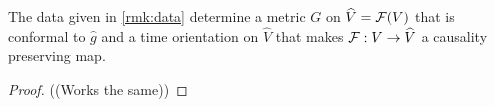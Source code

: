 \begin{lemma}\label{lem:constructmetric}
The data given in \ref{rmk:data} determine a metric $G$ on $\widehat{V}=\mathcal{F}(V)$ that is conformal to $\widehat{g}$ and a time orientation on $\widehat{V}$ that makes $\mathcal{F}:V\to \widehat{V}$ a causality preserving map.
\end{lemma}
\begin{proof}
((Works the same))
\end{proof}